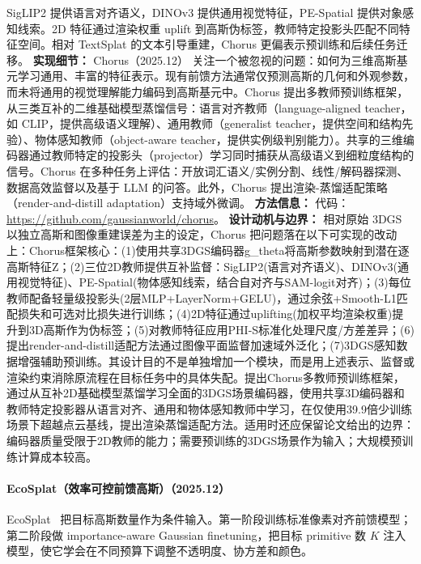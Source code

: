 SigLIP2 提供语言对齐语义，DINOv3 提供通用视觉特征，PE-Spatial 提供对象感知线索。2D 特征通过渲染权重 uplift 到高斯伪标签，教师特定投影头匹配不同特征空间。相对 TextSplat 的文本引导重建，Chorus 更偏表示预训练和后续任务迁移。
\textbf{实现细节：} Chorus（2025.12） 关注一个被忽视的问题：如何为三维高斯基元学习通用、丰富的特征表示。现有前馈方法通常仅预测高斯的几何和外观参数，而未将通用的视觉理解能力编码到高斯基元中。Chorus 提出多教师预训练框架，从三类互补的二维基础模型蒸馏信号：语言对齐教师（language-aligned teacher，如 CLIP，提供高级语义理解）、通用教师（generalist teacher，提供空间和结构先验）、物体感知教师（object-aware teacher，提供实例级判别能力）。共享的三维编码器通过教师特定的投影头（projector）学习同时捕获从高级语义到细粒度结构的信号。Chorus 在多种任务上评估：开放词汇语义/实例分割、线性/解码器探测、数据高效监督以及基于 LLM 的问答。此外，Chorus 提出渲染-蒸馏适配策略（render-and-distill adaptation）支持域外微调。
\textbf{方法信息：} 代码：\url{https://github.com/gaussianworld/chorus}。
\textbf{设计动机与边界：} 相对原始 3DGS 以独立高斯和图像重建误差为主的设定，Chorus 把问题落在以下可实现的改动上：Chorus框架核心：(1)使用共享3DGS编码器g\_theta将高斯参数映射到潜在逐高斯特征Z；(2)三位2D教师提供互补监督：SigLIP2(语言对齐语义)、DINOv3(通用视觉特征)、PE-Spatial(物体感知线索，结合自对齐与SAM-logit对齐)；(3)每位教师配备轻量级投影头(2层MLP+LayerNorm+GELU)，通过余弦+Smooth-L1匹配损失和可选对比损失进行训练；(4)2D特征通过uplifting(加权平均渲染权重)提升到3D高斯作为伪标签；(5)对教师特征应用PHI-S标准化处理尺度/方差差异；(6)提出render-and-distill适配方法通过图像平面监督加速域外泛化；(7)3DGS感知数据增强辅助预训练。其设计目的不是单独增加一个模块，而是用上述表示、监督或渲染约束消除原流程在目标任务中的具体失配。提出Chorus多教师预训练框架，通过从互补2D基础模型蒸馏学习全面的3DGS场景编码器，使用共享3D编码器和教师特定投影器从语言对齐、通用和物体感知教师中学习，在仅使用39.9倍少训练场景下超越点云基线，提出渲染蒸馏适配方法。适用时还应保留论文给出的边界：编码器质量受限于2D教师的能力；需要预训练的3DGS场景作为输入；大规模预训练计算成本较高。
\paragraph{EcoSplat（效率可控前馈高斯）（2025.12）}
EcoSplat~\cite{2512_18692} 把目标高斯数量作为条件输入。第一阶段训练标准像素对齐前馈模型；第二阶段做 importance-aware Gaussian finetuning，把目标 primitive 数 $K$ 注入模型，使它学会在不同预算下调整不透明度、协方差和颜色。

